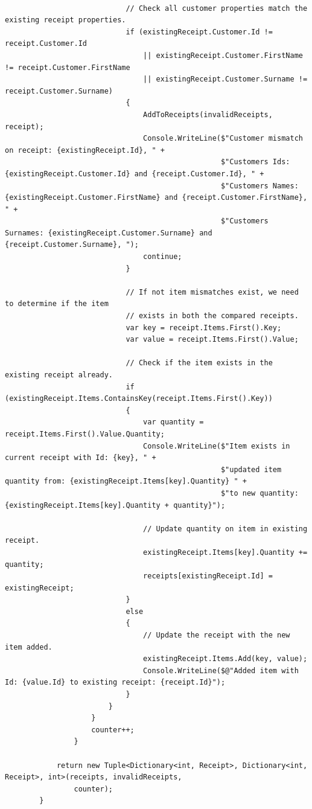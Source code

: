 \documentclass{article}
\begin{document}
\begin{lstlisting}
                            
                            // Check all customer properties match the existing receipt properties.
                            if (existingReceipt.Customer.Id != receipt.Customer.Id
                                || existingReceipt.Customer.FirstName != receipt.Customer.FirstName
                                || existingReceipt.Customer.Surname != receipt.Customer.Surname)
                            {
                                AddToReceipts(invalidReceipts, receipt);
                                Console.WriteLine($"Customer mismatch on receipt: {existingReceipt.Id}, " +
                                                  $"Customers Ids: {existingReceipt.Customer.Id} and {receipt.Customer.Id}, " +
                                                  $"Customers Names: {existingReceipt.Customer.FirstName} and {receipt.Customer.FirstName}, " +
                                                  $"Customers Surnames: {existingReceipt.Customer.Surname} and {receipt.Customer.Surname}, ");
                                continue;
                            }

                            // If not item mismatches exist, we need to determine if the item 
                            // exists in both the compared receipts.
                            var key = receipt.Items.First().Key;
                            var value = receipt.Items.First().Value;

                            // Check if the item exists in the existing receipt already.
                            if (existingReceipt.Items.ContainsKey(receipt.Items.First().Key))
                            {
                                var quantity = receipt.Items.First().Value.Quantity;
                                Console.WriteLine($"Item exists in current receipt with Id: {key}, " +
                                                  $"updated item quantity from: {existingReceipt.Items[key].Quantity} " +
                                                  $"to new quantity: {existingReceipt.Items[key].Quantity + quantity}");

                                // Update quantity on item in existing receipt.
                                existingReceipt.Items[key].Quantity += quantity;
                                receipts[existingReceipt.Id] = existingReceipt;
                            }
                            else
                            {
                                // Update the receipt with the new item added.
                                existingReceipt.Items.Add(key, value);
                                Console.WriteLine($@"Added item with Id: {value.Id} to existing receipt: {receipt.Id}");
                            }
                        }
                    }
                    counter++;
                }

            return new Tuple<Dictionary<int, Receipt>, Dictionary<int, Receipt>, int>(receipts, invalidReceipts,
                counter);
        }
    \end{lstlisting}
\end{document}
